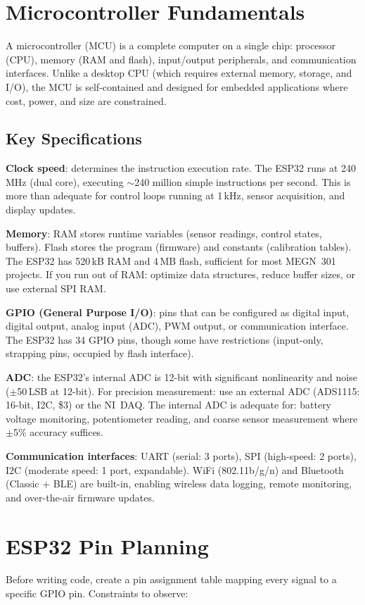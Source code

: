 \section{Microcontroller Fundamentals}
A microcontroller (MCU) is a complete computer on a single chip: processor (CPU), memory (RAM and flash), input/output peripherals, and communication interfaces. Unlike a desktop CPU (which requires external memory, storage, and I/O), the MCU is self-contained and designed for embedded applications where cost, power, and size are constrained.

\subsection{Key Specifications}
\textbf{Clock speed}: determines the instruction execution rate. The ESP32 runs at 240\,MHz (dual core), executing $\sim$240 million simple instructions per second. This is more than adequate for control loops running at 1\,kHz, sensor acquisition, and display updates.

\textbf{Memory}: RAM stores runtime variables (sensor readings, control states, buffers). Flash stores the program (firmware) and constants (calibration tables). The ESP32 has 520\,kB RAM and 4\,MB flash, sufficient for most MEGN~301 projects. If you run out of RAM: optimize data structures, reduce buffer sizes, or use external SPI RAM.

\textbf{GPIO (General Purpose I/O)}: pins that can be configured as digital input, digital output, analog input (ADC), PWM output, or communication interface. The ESP32 has 34 GPIO pins, though some have restrictions (input-only, strapping pins, occupied by flash interface).

\textbf{ADC}: the ESP32's internal ADC is 12-bit with significant nonlinearity and noise ($\pm$50\,LSB at 12-bit). For precision measurement: use an external ADC (ADS1115: 16-bit, I2C, \$3) or the NI~DAQ. The internal ADC is adequate for: battery voltage monitoring, potentiometer reading, and coarse sensor measurement where $\pm$5\% accuracy suffices.

\textbf{Communication interfaces}: UART (serial: 3 ports), SPI (high-speed: 2 ports), I2C (moderate speed: 1 port, expandable). WiFi (802.11b/g/n) and Bluetooth (Classic + BLE) are built-in, enabling wireless data logging, remote monitoring, and over-the-air firmware updates.

\section{ESP32 Pin Planning}
Before writing code, create a pin assignment table mapping every signal to a specific GPIO pin. Constraints to observe:


